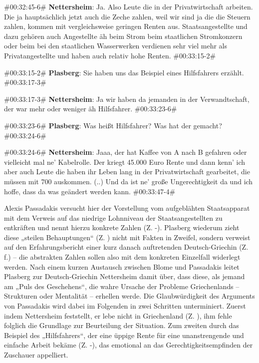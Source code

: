 \begin{description}
\begin{linenumbers}[1]
		\item \#00:32:45-6\# \textbf{Nettersheim}: Ja. Also Leute die in der Privatwirtschaft  arbeiten. Die ja hauptsächlich jetzt auch die Zeche zahlen, weil wir sind ja die die Steuern zahlen, kommen mit vergleichsweise geringen Renten aus. Staatsangestellte und dazu gehören auch Angestellte äh beim Strom beim staatlichen Stromkonzern oder beim bei den staatlichen Wasserwerken verdienen sehr viel mehr als Privatangestellte und haben auch relativ hohe Renten. \#00:33:15-2\# 
		
		\item \#00:33:15-2\# \textbf{Plasberg}:  Sie haben uns das Beispiel eines Hilfsfahrers erzählt. \#00:33:17-3\# 
		
		\item \#00:33:17-3\# \textbf{Nettersheim}: Ja wir haben da jemanden in der Verwandtschaft, der war mehr oder weniger äh Hilfsfahrer. \#00:33:23-6\# 
		
		\item \#00:33:23-6\# \textbf{Plasberg}: Was heißt Hilfsfahrer? Was hat der gemacht? \#00:33:24-6\# 
		
		\item \#00:33:24-6\# \textbf{Nettersheim}: Jaaa, der hat Kaffee von A nach B gefahren oder vielleicht mal ne' Kabelrolle. Der kriegt 45.000 Euro Rente und dann kenn' ich aber auch Leute die haben ihr Leben lang in der Privatwirtschaft gearbeitet, die müssen mit 700 auskommen. (..) Und da ist ne' große Ungerechtigkeit da und ich hoffe, dass da was geändert werden kann. \#00:33:47-4\#
	\end{linenumbers}
\end{description}

Alexis Passadakis versucht hier der Vorstellung vom aufgeblähten Staatsapparat mit dem Verweis auf das niedrige Lohnniveau der Staatsangestellten zu entkräften und nennt hierzu konkrete Zahlen (Z. -). Plasberg wiederum zieht diese „steilen Behauptungen“ (Z. ) nicht mit Fakten in Zweifel, sondern verweist auf den Erfahrungsbericht einer kurz danach auftretenden Deutsch-Griechin (Z. f.) – die abstrakten Zahlen sollen also mit dem konkreten Einzelfall widerlegt werden. Nach einem kurzen Austausch zwischen Blome und Passadakis leitet Plasberg zur Deutsch-Griechin Nettersheim damit über, dass diese, als jemand am „Puls des Geschehens“, die wahre Ursache der Probleme Griechenlands – Strukturen oder Mentalität – erhellen werde. Die Glaubwürdigkeit des Arguments von Passadakis wird dabei im Folgenden in zwei Schritten unterminiert. Zuerst indem Nettersheim feststellt, er lebe nicht in Griechenland (Z. ), ihm fehle folglich die Grundlage zur Beurteilung der Situation. Zum zweiten durch das Beispiel des „Hilfsfahrers“, der eine üppige Rente für eine unanstrengende und einfache Arbeit bekäme (Z. -), das emotional an das Gerechtigkeitsempfinden der Zuschauer appelliert.

